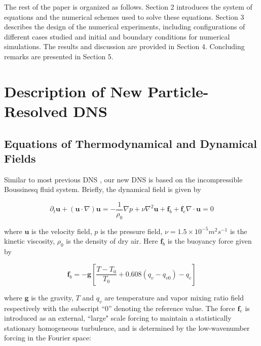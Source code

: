 \documentclass[draft,jgrga]{AGUTeX}
\begin{document}
\begin{article}
The rest of the paper is organized as follows. Section 2 introduces the system of equations and the numerical schemes used to solve these equations. Section 3 describes the design of the numerical experiments, including configurations of different cases studied and initial and boundary conditions for numerical simulations. The results and discussion are provided in Section 4. Concluding remarks are presented in Section 5. 

\section{Description of New Particle-Resolved DNS}\label{particle_dns}

\subsection{Equations of Thermodynamical and Dynamical Fields}

Similar to most previous DNS \cite{And04}, our new DNS is based on 
the incompressible Boussinesq fluid system. Briefly, the dynamical 
field is given by

\begin{subequations}

\begin{equation}
\partial_{t}\mathbf{u}+(\mathbf{u}\cdot\nabla)\mathbf{u}=-\frac{1}{\rho_{0}}\nabla p+\nu\nabla^2 \mathbf{u}+\mathbf{f}_b + \mathbf{f}_e\label{eq:NS1}
\end{equation}


\begin{equation}
\nabla\cdot \mathbf{u}=0\label{eq:NS2}
\end{equation}

\end{subequations}

where $\mathbf{u}$ is the velocity field, $p$ is the pressure field, $\nu = 1.5\times 10^{-5}m^2s^{-1}$ is the kinetic viscosity, $\rho_{0}$ is the density of dry air. Here $\mathbf{f}_b$ is the buoyancy force given by 

\begin{equation}
\mathbf{f}_b= 
-\mathbf{g}[\frac{T-T_{0}}{T_0}+0.608(q_{v}-q_{v0})-q_{c}]
\label{eq:source_term}
\end{equation}

where $\mathbf{g}$ is the gravity, $T$ and $q_{v}$ are temperature
and vapor mixing ratio field respectively with the subscript ``$0$''
denoting the reference value. The force $\mathbf{f}_e$ is introduced as an external, ``large" scale forcing to maintain a statistically stationary homogeneous turbulence, and is determined by the low-wavenumber forcing in the Fourier space:


\end{article}
\end{document}

